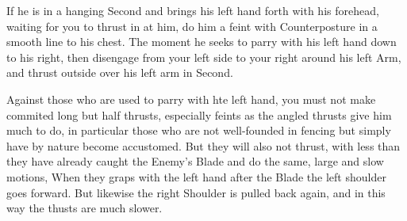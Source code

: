 \exercise{}

If he is in a hanging Second and brings his left hand forth with his forehead, waiting for you to thrust in at him, do him a feint with Counterposture in a smooth line to his chest. The moment he seeks to parry with his left hand down to his right, then disengage from your left side to your right around his left Arm, and thrust outside over his left arm in Second.

\exercise{}

Against those who are used to parry with hte left hand, you must not make commited long but half thrusts, especially feints as the angled thrusts give him much to do, in particular those who are not well-founded in fencing but simply have by nature become accustomed. But they will also not thrust, with less than they have already caught the Enemy's Blade and do the same, large and slow motions, When they graps with the left hand after the Blade the left shoulder goes forward. But likewise the right Shoulder is pulled back again, and in this way the thusts are much slower.
